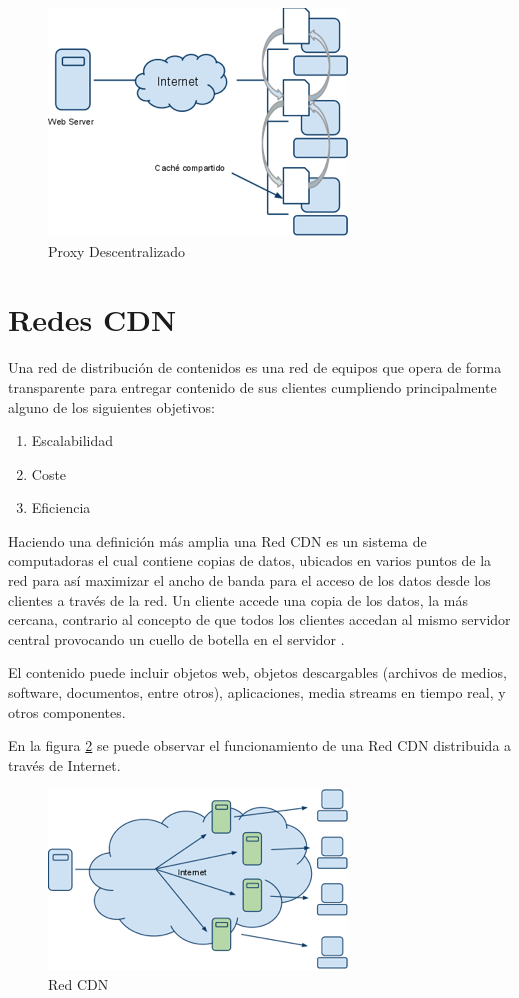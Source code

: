 \begin{figure}[h]
  \centering
    \includegraphics[scale=1]{gfx/proxy_descentralizado}
  \caption{Proxy Descentralizado}
  \label{proxy_descentralizado}
\end{figure}

\section{Redes CDN}
Una red de distribución de contenidos es una red de equipos que opera de forma transparente para entregar contenido de sus clientes cumpliendo principalmente alguno de los siguientes objetivos:
\begin{enumerate}
\item Escalabilidad
\item Coste
\item Eficiencia
\end{enumerate}

Haciendo una definición más amplia una Red CDN es un sistema de computadoras el cual contiene copias de datos, ubicados en varios puntos de la red para así maximizar el ancho de banda para el acceso de los datos desde los clientes a través de la red. Un cliente accede una copia de los datos, la más cercana, contrario al concepto de que todos los clientes accedan al mismo servidor central provocando un cuello de botella en el servidor \cite{wiki_cdn}.

El contenido puede incluir objetos web, objetos descargables (archivos de medios, software, documentos, entre otros), aplicaciones, media streams en tiempo real, y otros componentes.

En la figura \ref{redes_cdn} se puede observar el funcionamiento de una Red CDN distribuida a través de Internet.

\begin{figure}[h]
  \centering
    \includegraphics[scale=1]{gfx/redes_cdn}
  \caption{Red CDN}
  \label{redes_cdn}
\end{figure}
